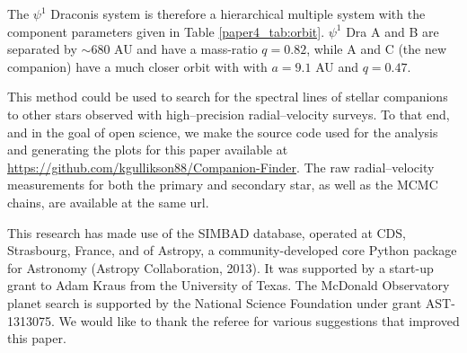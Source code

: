 The $\psi^1$ Draconis system is therefore a hierarchical multiple system with the component parameters given in Table \ref{paper4_tab:orbit}. $\psi^1$ Dra A and B are separated by ${\sim}680$ AU and have a mass-ratio $q = 0.82$, while A and C (the new companion) have a much closer orbit with with $a = 9.1$ AU and $q = 0.47$. 

This method could be used to search for the spectral lines of stellar companions to other stars observed with high--precision radial--velocity surveys. To that end, and in the goal of open science, we make the source code used for the analysis and generating the plots for this paper available at \url{https://github.com/kgullikson88/Companion-Finder}. The raw radial--velocity measurements for both the primary and secondary star, as well as the MCMC chains, are available at the same url.

This research has made use of the SIMBAD database, operated at CDS, Strasbourg, France, and of Astropy, a community-developed core Python package for Astronomy (Astropy Collaboration, 2013).
It was supported by a start-up grant to Adam Kraus from the University of Texas. The McDonald Observatory planet search is supported by the National Science Foundation under grant AST-1313075. We would like to thank the referee for various suggestions that improved this paper.


